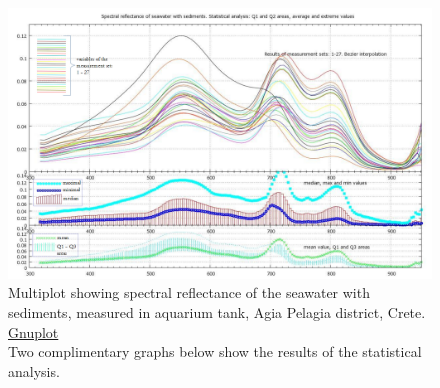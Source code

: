 \documentclass[11pt]{article}
\begin{document}
\begin{figure}[H]
	\centering
	\includegraphics[scale=0.3]{GNU-18-legend.png}
	\caption{Multiplot showing spectral reflectance of the seawater with sediments, measured in aquarium tank, Agia Pelagia district, Crete. \href{http://www.gnuplot.info/}{Gnuplot} \\Two complimentary graphs below show the results of the statistical analysis.}
	\label{fig:4.4}
\end{figure}
\end{document}
